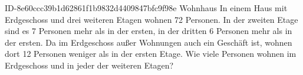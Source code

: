 \begin{exercise}
      {ID-8e60ccc39b1d62861f1b9832d4409847bfc9f98e}
      {Wohnhaus}
  \ifproblem\problem
    In einem Haus mit Erdgeschoss und drei weiteren Etagen wohnen 72 Personen.
    In der zweiten Etage sind es 7 Personen mehr als in der ersten, in der
    dritten 6 Personen mehr als in der ersten. Da im Erdgeschoss außer
    Wohnungen auch ein Geschäft ist, wohnen dort 12 Personen weniger als in
    der ersten Etage. Wie viele Personen wohnen im Erdgeschoss und in jeder
    der weiteren Etagen?
  \fi
\end{exercise}
